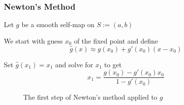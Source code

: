 \begin{frame}
    \frametitle{Newton's Method}

    \vspace{0.3em}
    Let $g$ be a smooth self-map on $S := (a, b)$ 

    \vspace{0.3em}
    \vspace{0.3em}
    We start with guess $x_0$ of the fixed point and define
    $$\hat g(x) \approx g(x_0) + g'(x_0)(x - x_0)$$

    \vspace{0.3em}
    Set $\hat g(x_1) = x_1$ and solve for $x_1$ to get
    \begin{equation*}
        x_1 = \frac{g(x_0) - g'(x_0) x_0}{1 - g'(x_0)}
    \end{equation*}

\end{frame}


\begin{frame}

    \begin{figure}
       \centering
       \caption{\label{f:newton_1} The first step of Newton's method applied to $g$}
    \end{figure}

\end{frame}

